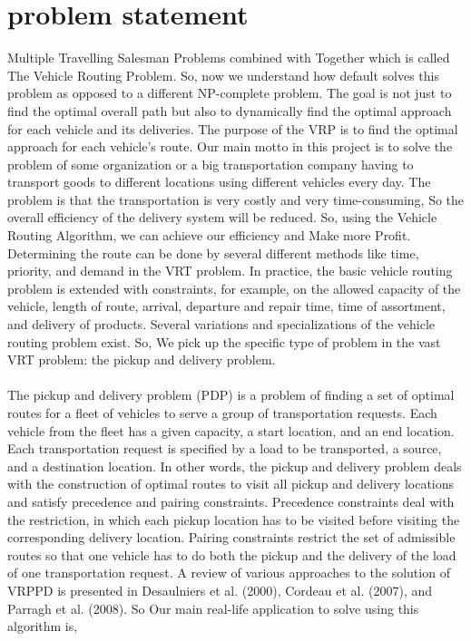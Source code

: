 \documentclass[conference]{IEEEtran}
\begin{document}
{\section{\textbf{problem statement}}}  
Multiple Travelling Salesman Problems combined with Together which is called The Vehicle Routing Problem. So, now we understand how default solves this problem as opposed to a different NP-complete problem. The goal is not just to find the optimal overall path but also to dynamically find the optimal approach for each vehicle and its deliveries. The purpose of the VRP is to find the optimal approach for each vehicle's route. Our main motto in this project is to solve the problem of some organization or a big transportation company having to transport goods to different locations using different vehicles every day. The problem is that the transportation is very costly and very time-consuming, So the overall efficiency of the delivery system will be reduced. So, using the Vehicle Routing Algorithm, we can achieve our efficiency and Make more Profit. Determining the route can be done by several different methods like time, priority, and demand in the VRT problem. In practice, the basic vehicle routing problem is extended with constraints, for example, on the allowed capacity of the vehicle, length of route, arrival, departure and repair time, time of assortment, and delivery of products. Several variations and specializations of the vehicle routing problem exist. So, We pick up the specific type of problem in the vast VRT problem: the pickup and delivery problem.\\
\\ The pickup and delivery problem (PDP) is a problem of finding a set of optimal routes for a fleet of vehicles to serve a group of transportation requests. Each vehicle from the fleet has a given capacity, a start location, and an end location. Each transportation request is specified by a load to be transported, a source, and a destination location. In other words, the pickup and delivery problem deals with the construction of optimal routes to visit all pickup and delivery locations and satisfy precedence and pairing constraints. Precedence constraints deal with the restriction, in which each pickup location has to be visited before visiting the corresponding delivery location. Pairing constraints restrict the set of admissible routes so that one vehicle has to do both the pickup and the delivery of the load of one transportation request. A review of various approaches to the solution of VRPPD is presented in Desaulniers et al. (2000), Cordeau et al. (2007), and Parragh et al. (2008). So Our main real-life application to solve using this algorithm
is,
\end{document}
